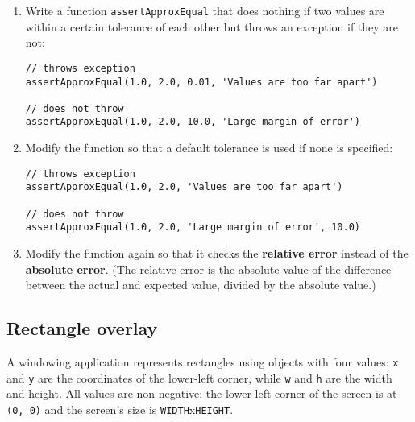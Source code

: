 \documentclass[krantzl]{krantz}
\newcommand{\glossref}[1]{\textbf{#1}}
\begin{document}
\begin{enumerate}

\item 

Write a function \texttt{assertApproxEqual} that does nothing if two values are within a certain tolerance of each other
    but throws an exception if they are not:

\begin{lstlisting}[frame=tblr]
// throws exception
assertApproxEqual(1.0, 2.0, 0.01, 'Values are too far apart')

// does not throw
assertApproxEqual(1.0, 2.0, 10.0, 'Large margin of error')
\end{lstlisting}



\item 

Modify the function so that a default tolerance is used if none is specified:

\begin{lstlisting}[frame=tblr]
// throws exception
assertApproxEqual(1.0, 2.0, 'Values are too far apart')

// does not throw
assertApproxEqual(1.0, 2.0, 'Large margin of error', 10.0)
\end{lstlisting}



\item 

Modify the function again so that it checks the \glossref{relative error}
    instead of the \glossref{absolute error}.
    (The relative error is the absolute value of the difference between the actual and expected value,
    divided by the absolute value.)



\end{enumerate}

\subsection*{Rectangle overlay}


A windowing application represents rectangles using objects with four values:
\texttt{x} and \texttt{y} are the coordinates of the lower-left corner,
while \texttt{w} and \texttt{h} are the width and height.
All values are non-negative:
the lower-left corner of the screen is at \texttt{(0, 0)}
and the screen’s size is \texttt{WIDTH}x\texttt{HEIGHT}.
\end{document}
